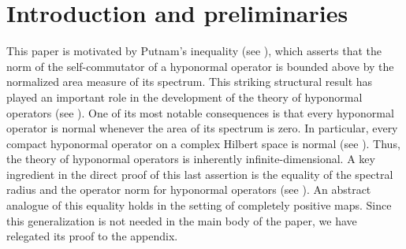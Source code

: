 \documentclass[10pt, a4paper, oneside, reqno]{amsproc}
\numberwithin{equation}{section}
\theoremstyle{remark}
\theoremstyle{definition}
\begin{document}

\section{Introduction and preliminaries}
This paper is motivated by Putnam's inequality (see \cite[Theorem~1]{P1970}), which asserts that the norm of the self-commutator of a hyponormal operator is bounded above by the normalized area measure of its spectrum. This striking structural result has played an important role in the development of the theory of hyponormal operators (see \cite{MP1989}). 
One of its most notable consequences is that every hyponormal operator is normal whenever the area of its spectrum is zero.
In particular, every compact hyponormal operator on a complex Hilbert space is normal (see \cite[Corollary~III.1.6]{MP1989}).
Thus, the theory of hyponormal operators is inherently infinite-dimensional. A key ingredient in the direct proof of this last assertion is the equality of the spectral radius and the operator norm for hyponormal operators (see \cite[Corollary~III.1.4]{MP1989}). An abstract analogue of this equality holds in the setting of completely positive maps. Since this generalization is not needed in the main body of the paper, we have relegated its proof to the appendix.
\end{document}
